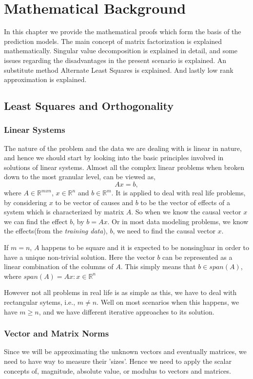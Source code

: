 \chapter{Mathematical Background}

\textsf{ In this chapter we provide the mathematical proofs which form the basis
of the prediction models. The main concept of matrix factorization is explained
mathematically. Singular value decomposition is explained in detail, and some
issues regarding the disadvantages in the present scenario is explained. An
substitute method Alternate Least Squares is explained. And lastly low rank
approximation is explained.}

\section{Least Squares and Orthogonality}
\subsection{Linear Systems}
The nature of the problem and the data we are dealing with is linear in nature,
and hence we should start by looking into the basic principles involved in
solutions of linear systems. Almost all the complex linear problems when broken
down to the most granular level, can be viewed as,
\begin{equation}
  Ax=b,
\end{equation}
where $A\in\mathbb{R}^{m x n}$, $x\in \mathbb{R}^n$ and $b\in \mathbb{R}^m$. It
is applied to deal with real life problems, by considering $x$ to be vector of
causes and $b$ to be the vector of effects of a system which is characterized by
matrix $A$. So when we know the causal vector $x$ we can find the effect $b$, by
$b=Ax$. Or in most data modeling problems, we know the effects(from the
\emph{training data}), $b$, we need to find the causal vector $x$. 

If $m=n$, $A$ happens to be square and it is
expected to be nonsingluar in order to have a unique non-trivial solution. Here
the vector $b$ can be represented as a linear combination of the columns of $A$.
This simply means that $b\in span(A)$, where $span(A)={Ax:x\in \mathbb{R}^n}$ 

However not all problems in real life is as simple as this, we have to deal with
rectangular sytems, i.e., $m\neq n$. Well on most scenarios when this happens,
we have $m\geq n$, and we have different iterative approaches to its solution. 
\subsection{Vector and Matrix Norms}
Since we will be approximating the unknown vectors and eventually matrices, we
need to have way to measure their 'sizes'. Hence we need to apply the scalar
concepts of, magnitude, absolute value, or modulus to vectors and matrices.

